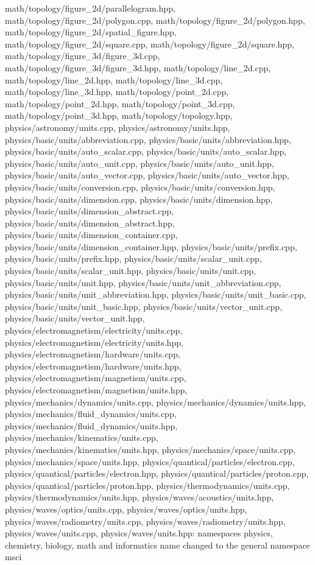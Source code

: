\begin{DoxyVerb}
math/topology/figure_2d/parallelogram.hpp,
math/topology/figure_2d/polygon.cpp,
math/topology/figure_2d/polygon.hpp,
math/topology/figure_2d/spatial_figure.hpp,
math/topology/figure_2d/square.cpp,
math/topology/figure_2d/square.hpp,
math/topology/figure_3d/figure_3d.cpp,
math/topology/figure_3d/figure_3d.hpp, math/topology/line_2d.cpp,
math/topology/line_2d.hpp, math/topology/line_3d.cpp,
math/topology/line_3d.hpp, math/topology/point_2d.cpp,
math/topology/point_2d.hpp, math/topology/point_3d.cpp,
math/topology/point_3d.hpp, math/topology/topology.hpp,
physics/astronomy/units.cpp, physics/astronomy/units.hpp,
physics/basic/units/abbreviation.cpp,
physics/basic/units/abbreviation.hpp,
physics/basic/units/auto_scalar.cpp,
physics/basic/units/auto_scalar.hpp,
physics/basic/units/auto_unit.cpp,
physics/basic/units/auto_unit.hpp,
physics/basic/units/auto_vector.cpp,
physics/basic/units/auto_vector.hpp,
physics/basic/units/conversion.cpp,
physics/basic/units/conversion.hpp,
physics/basic/units/dimension.cpp,
physics/basic/units/dimension.hpp,
physics/basic/units/dimension_abstract.cpp,
physics/basic/units/dimension_abstract.hpp,
physics/basic/units/dimension_container.cpp,
physics/basic/units/dimension_container.hpp,
physics/basic/units/prefix.cpp, physics/basic/units/prefix.hpp,
physics/basic/units/scalar_unit.cpp,
physics/basic/units/scalar_unit.hpp, physics/basic/units/unit.cpp,
physics/basic/units/unit.hpp,
physics/basic/units/unit_abbreviation.cpp,
physics/basic/units/unit_abbreviation.hpp,
physics/basic/units/unit_basic.cpp,
physics/basic/units/unit_basic.hpp,
physics/basic/units/vector_unit.cpp,
physics/basic/units/vector_unit.hpp,
physics/electromagnetism/electricity/units.cpp,
physics/electromagnetism/electricity/units.hpp,
physics/electromagnetism/hardware/units.cpp,
physics/electromagnetism/hardware/units.hpp,
physics/electromagnetism/magnetism/units.cpp,
physics/electromagnetism/magnetism/units.hpp,
physics/mechanics/dynamics/units.cpp,
physics/mechanics/dynamics/units.hpp,
physics/mechanics/fluid_dynamics/units.cpp,
physics/mechanics/fluid_dynamics/units.hpp,
physics/mechanics/kinematics/units.cpp,
physics/mechanics/kinematics/units.hpp,
physics/mechanics/space/units.cpp,
physics/mechanics/space/units.hpp,
physics/quantical/particles/electron.cpp,
physics/quantical/particles/electron.hpp,
physics/quantical/particles/proton.cpp,
physics/quantical/particles/proton.hpp,
physics/thermodynamics/units.cpp, physics/thermodynamics/units.hpp,
physics/waves/acoustics/units.hpp, physics/waves/optics/units.cpp,
physics/waves/optics/units.hpp, physics/waves/radiometry/units.cpp,
physics/waves/radiometry/units.hpp, physics/waves/units.cpp,
physics/waves/units.hpp: namespaces physics, chemistry, biology,
math and informatics name changed to the general namespace msci
\end{DoxyVerb}

